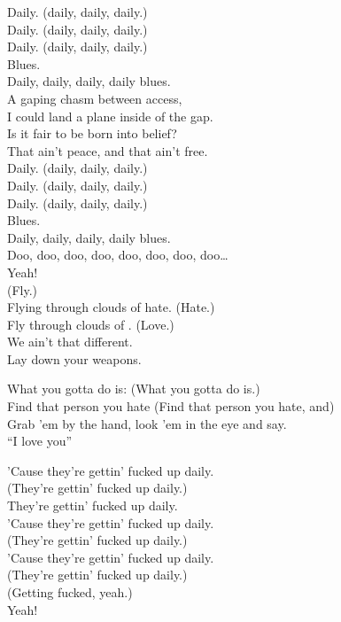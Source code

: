 Daily. (daily, daily, daily.) \\
Daily. (daily, daily, daily.) \\
Daily. (daily, daily, daily.) \\
Blues. \\
Daily, daily, daily, daily blues. \\

A gaping chasm between access, \\
I could land a plane inside of the gap. \\
Is it fair to be born into belief? \\
That ain't peace, and that ain't free. \\

Daily. (daily, daily, daily.) \\
Daily. (daily, daily, daily.) \\
Daily. (daily, daily, daily.) \\
Blues. \\
Daily, daily, daily, daily blues. \\

Doo, doo, doo, doo, doo, doo, doo, doo… \\
Yeah! \\

(Fly.) \\
Flying through clouds of hate. (Hate.) \\
Fly through clouds of . (Love.) \\
We ain't that different. \\
Lay down your weapons. \\


What you gotta do is: (What you gotta do is.) \\
Find that person you hate (Find that person you hate, and) \\
Grab 'em by the hand, look 'em in the eye and say. \\
``I love you'' \\


'Cause they're gettin' fucked up daily. \\
(They're gettin' fucked up daily.) \\
They're gettin' fucked up daily. \\
'Cause they're gettin' fucked up daily. \\
(They're gettin' fucked up daily.) \\
'Cause they're gettin' fucked up daily. \\
(They're gettin' fucked up daily.) \\
(Getting fucked, yeah.) \\
Yeah!

